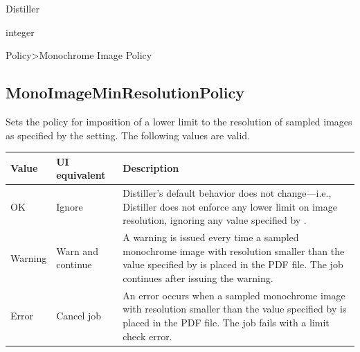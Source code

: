 \documentclass[letterpaper,12pt,english,openany,oneside]{sphinxmanual}
\begin{document}
\label{\detokenize{PDF_Create_CommonSettings:supported-by-63}}

Distiller

\label{\detokenize{PDF_Create_CommonSettings:type-63}}

integer

\label{\detokenize{PDF_Create_CommonSettings:ui-name-49}}

Policy\sphinxhyphen{}>Monochrome Image Policy

\label{\detokenize{PDF_Create_CommonSettings:default-value-59}}

\begin{sphinxVerbatim}[commandchars=\\\{\}]
\end{sphinxVerbatim}




\subsection{MonoImageMinResolutionPolicy}
\label{\detokenize{PDF_Create_CommonSettings:monoimageminresolutionpolicy}}
Sets the policy for imposition of a lower limit to the resolution of sampled images as specified by the  setting. The following values are valid.


\begin{savenotes}\sphinxattablestart
\centering
{}\label{\detokenize{PDF_Create_CommonSettings:section-13}}\nobreak
\begin{tabulary}{\linewidth}[t]{|T|T|T|}
\hline
\sphinxstyletheadfamily 
Value
&\sphinxstyletheadfamily 
UI equivalent
&\sphinxstyletheadfamily 
Description
\\
\hline
OK
&
Ignore
&
Distiller’s default behavior does not change—i.e., Distiller does not enforce any lower limit on image resolution, ignoring any value specified by  .
\\
\hline
Warning
&
Warn and continue
&
A warning is issued every time a sampled monochrome image with resolution smaller than the value specified by  is placed in the PDF file. The job continues after issuing the warning.
\\
\hline
Error
&
Cancel job
&
An error occurs when a sampled monochrome image with resolution smaller than the value specified by  is placed in the PDF file. The job fails with a limit check error.
\\
\hline
\end{tabulary}
\par
\sphinxattableend\end{savenotes}
\end{document}
